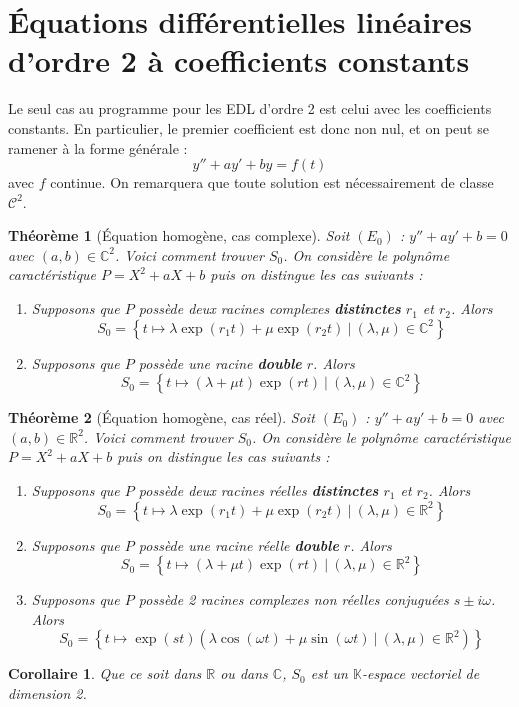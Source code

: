 \documentclass[french]{book}
\newcommand{\R}{\mathbb{R}}
\newcommand{\C}{\mathbb{C}}
\newcommand{\K}{\mathbb{K}}
\theoremstyle{plain}
\newtheorem{thm}{Théorème}[chapter]
\newtheorem{cor}{Corollaire}[chapter]
\theoremstyle{definition}
\theoremstyle{remark}
\begin{document}
\section{Équations différentielles linéaires d'ordre 2 à coefficients constants}
Le seul cas au programme pour les EDL d'ordre 2 est celui avec les coefficients constants. En particulier, le premier coefficient est donc non nul, et on peut se ramener à la forme générale :$$y''+ay'+by=f(t)$$ avec $f$ continue. On remarquera que toute solution est nécessairement de classe $\mathcal{C}^2$.
\begin{thm}[Équation homogène, cas complexe]
	Soit $(E_0)$ : $y''+ay'+b=0$ avec $(a,b)\in\C^2$. Voici comment trouver $S_0$. On considère le polynôme caractéristique $P=X^2+aX+b$ puis on distingue les cas suivants :
	\begin{enumerate}
		\item Supposons que $P$ possède deux racines complexes \textbf{distinctes} $r_1$ et $r_2$. Alors $$S_0=\left\{t\mapsto\lambda\exp(r_1t)+\mu\exp(r_2t) \ | \ (\lambda,\mu)\in\C^2\right\}$$
		\item Supposons que $P$ possède une racine \textbf{double} $r$. Alors $$S_0=\left\{t\mapsto(\lambda+\mu t)\exp(rt) \ | \ (\lambda,\mu)\in\C^2\right\}$$
	\end{enumerate}
\end{thm}
\begin{thm}[Équation homogène, cas réel]
	Soit $(E_0)$ : $y''+ay'+b=0$ avec $(a,b)\in\R^2$. Voici comment trouver $S_0$. On considère le polynôme caractéristique $P=X^2+aX+b$ puis on distingue les cas suivants :
	\begin{enumerate}
		\item Supposons que $P$ possède deux racines réelles \textbf{distinctes} $r_1$ et $r_2$. Alors $$S_0=\left\{t\mapsto\lambda\exp(r_1t)+\mu\exp(r_2t) \ | \ (\lambda,\mu)\in\R^2\right\}$$
		\item Supposons que $P$ possède une racine réelle \textbf{double} $r$. Alors $$S_0=\left\{t\mapsto(\lambda+\mu t)\exp(rt) \ | \ (\lambda,\mu)\in\R^2\right\}$$
		\item Supposons que $P$ possède 2 racines complexes non réelles conjuguées $s\pm i\omega$. Alors $$S_0=\left\{t\mapsto \exp(st)(\lambda\cos(\omega t)+\mu\sin(\omega t) \ | \ (\lambda,\mu)\in\R^2)\right\}$$
	\end{enumerate}
\end{thm}
\begin{cor}
	Que ce soit dans $\R$ ou dans $\C$, $S_0$ est un $\K$-espace vectoriel de dimension 2.
\end{cor}
\end{document}
